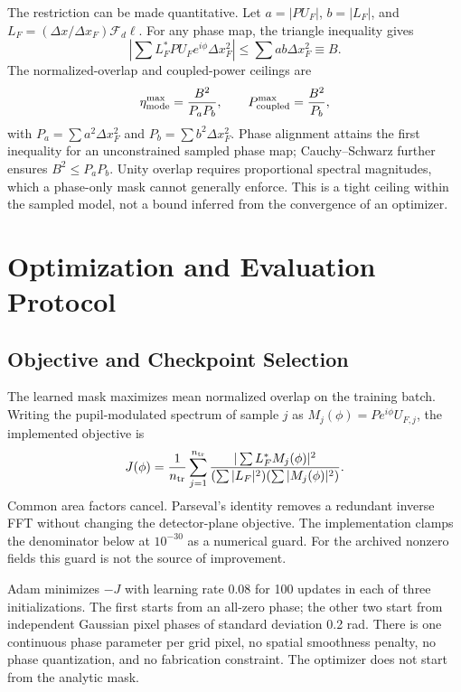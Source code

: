 \documentclass[journal]{IEEEtran}
\newcommand{\etam}{\eta_{\mathrm{mode}}}
\newcommand{\F}{\mathcal{F}}
\begin{document}
The restriction can be made quantitative. Let $a=|P U_F|$, $b=|L_F|$, and $L_F=(\Delta x/\Delta x_F)\F_d\ell$. For any phase map, the triangle inequality gives
\begin{equation}
 \left|\sum L_F^* P U_F e^{i\phi}\Delta x_F^2\right|
 \leq \sum ab\Delta x_F^2\equiv B.
\end{equation}
The normalized-overlap and coupled-power ceilings are
\begin{equation}
 \etam^{\max}=\frac{B^2}{P_aP_b},\qquad
 P_{\rm coupled}^{\max}=\frac{B^2}{P_b},
 \label{eq:bound}
\end{equation}
with $P_a=\sum a^2\Delta x_F^2$ and $P_b=\sum b^2\Delta x_F^2$. Phase alignment attains the first inequality for an unconstrained sampled phase map; Cauchy--Schwarz further ensures $B^2\leq P_aP_b$. Unity overlap requires proportional spectral magnitudes, which a phase-only mask cannot generally enforce. This is a tight ceiling within the sampled model, not a bound inferred from the convergence of an optimizer.

\section{Optimization and Evaluation Protocol}
\subsection{Objective and Checkpoint Selection}
The learned mask maximizes mean normalized overlap on the training batch. Writing the pupil-modulated spectrum of sample $j$ as $M_j(\phi)=P e^{i\phi}U_{F,j}$, the implemented objective is
\begin{equation}
 J(\phi)=\frac{1}{n_{\rm tr}}\sum_{j=1}^{n_{\rm tr}}
 \frac{|\sum L_F^*M_j(\phi)|^2}
 {(\sum |L_F|^2)(\sum |M_j(\phi)|^2)}.
 \label{eq:objective}
\end{equation}
Common area factors cancel. Parseval's identity removes a redundant inverse FFT without changing the detector-plane objective. The implementation clamps the denominator below at $10^{-30}$ as a numerical guard. For the archived nonzero fields this guard is not the source of improvement.

Adam minimizes $-J$ with learning rate 0.08 for 100 updates in each of three initializations. The first starts from an all-zero phase; the other two start from independent Gaussian pixel phases of standard deviation 0.2 rad. There is one continuous phase parameter per grid pixel, no spatial smoothness penalty, no phase quantization, and no fabrication constraint. The optimizer does not start from the analytic mask.
\end{document}
